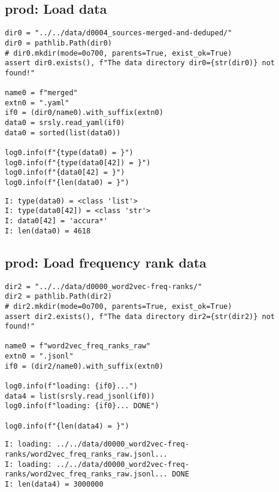 \documentclass[a4paper,10pt,onecolumn,oneside,openright]{article}
\begin{document}
\subsection{prod: Load data}
\label{sec:orge4681d9}
\begin{verbatim}
dir0 = "../../data/d0004_sources-merged-and-deduped/"
dir0 = pathlib.Path(dir0)
# dir0.mkdir(mode=0o700, parents=True, exist_ok=True)
assert dir0.exists(), f"The data directory dir0={str(dir0)} not found!"

name0 = f"merged"
extn0 = ".yaml"
if0 = (dir0/name0).with_suffix(extn0)
data0 = srsly.read_yaml(if0)
data0 = sorted(list(data0))

log0.info(f"{type(data0) = }")
log0.info(f"{type(data0[42]) = }")
log0.info(f"{data0[42] = }")
log0.info(f"{len(data0) = }")

\end{verbatim}

\begin{verbatim}
I: type(data0) = <class 'list'>
I: type(data0[42]) = <class 'str'>
I: data0[42] = 'accura*'
I: len(data0) = 4618
\end{verbatim}

\subsection{prod: Load frequency rank data}
\label{sec:org3c47303}
\begin{verbatim}
dir2 = "../../data/d0000_word2vec-freq-ranks/"
dir2 = pathlib.Path(dir2)
# dir2.mkdir(mode=0o700, parents=True, exist_ok=True)
assert dir2.exists(), f"The data directory dir2={str(dir2)} not found!"

name0 = f"word2vec_freq_ranks_raw"
extn0 = ".jsonl"
if0 = (dir2/name0).with_suffix(extn0)

log0.info(f"loading: {if0}...")
data4 = list(srsly.read_jsonl(if0))
log0.info(f"loading: {if0}... DONE")

log0.info(f"{len(data4) = }")
\end{verbatim}

\begin{verbatim}
I: loading: ../../data/d0000_word2vec-freq-ranks/word2vec_freq_ranks_raw.jsonl...
I: loading: ../../data/d0000_word2vec-freq-ranks/word2vec_freq_ranks_raw.jsonl... DONE
I: len(data4) = 3000000
\end{verbatim}
\end{document}
